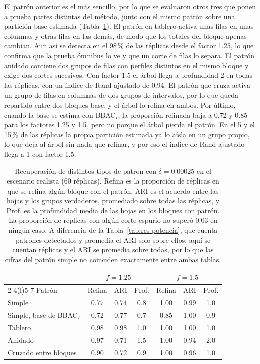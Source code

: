 El patrón anterior es el más sencillo, por lo que se evaluaron otros tres que ponen
a prueba partes distintas del método, junto con el mismo patrón sobre una partición
base estimada (Tabla~\ref{tab:res-patrones}). El patrón en tablero activa unas
filas en unas columnas y otras filas en las demás, de modo que los totales del
bloque apenas cambian. Aun así se detecta en el 98\,\% de las réplicas desde el
factor 1.25, lo que confirma que la prueba ómnibus lo ve y que un corte de filas lo
separa. El patrón anidado contiene dos grupos de filas con perfiles distintos en el
mismo bloque y exige dos cortes sucesivos. Con factor 1.5 el árbol llega a
profundidad 2 en todas las réplicas, con un índice de Rand ajustado de 0.94. El
patrón que cruza activa un grupo de filas en columnas de dos grupos de intervalos,
por lo que queda repartido entre dos bloques base, y el árbol lo refina en ambos.
Por último, cuando la base se estima con BBAC$_I$, la proporción refinada baja a
0.72 y 0.85 para los factores 1.25 y 1.5, pero no porque el árbol pierda el patrón.
En el 5 y el 15\,\% de las réplicas la propia partición estimada ya lo aísla en
un grupo propio, lo que deja al árbol sin nada que refinar, y por eso el índice de
Rand ajustado llega a 1 con factor 1.5.

\begin{table}[t]
\centering
\small
\begin{tabular}{@{}lcccccc@{}}
\toprule
 & \multicolumn{3}{c}{$f = 1.25$} & \multicolumn{3}{c}{$f = 1.5$} \\
\cmidrule(lr){2-4}\cmidrule(l){5-7}
Patrón & Refina & ARI & Prof. & Refina & ARI & Prof. \\
\midrule
Simple                       & 0.77 & 0.74 & 0.8 & 1.00 & 0.99 & 1.0 \\
Simple, base de BBAC$_I$     & 0.72 & 0.77 & 0.7 & 0.85 & 1.00 & 0.9 \\
Tablero                      & 0.98 & 0.98 & 1.0 & 1.00 & 1.00 & 1.0 \\
Anidado                      & 0.97 & 0.71 & 1.5 & 1.00 & 0.94 & 2.0 \\
Cruzado entre bloques        & 0.90 & 0.72 & 0.9 & 1.00 & 0.96 & 1.0 \\
\bottomrule
\end{tabular}
\caption{Recuperación de distintos tipos de patrón con $\delta = 0.00025$ en el
escenario realista (60 réplicas). Refina es la proporción de réplicas en que se
refina algún bloque con el patrón, ARI es el acuerdo entre las hojas y los grupos
verdaderos, promediado sobre todas las réplicas, y Prof. es la profundidad media
de las hojas en los bloques con patrón. La proporción de réplicas con algún corte
espurio no superó 0.03 en ningún caso. A diferencia de la
Tabla~\ref{tab:res-potencia}, que cuenta patrones detectados y promedia el ARI
solo sobre ellos, aquí se cuentan réplicas y el ARI se promedia sobre todas, por
lo que las cifras del patrón simple no coinciden exactamente entre ambas tablas.}
\label{tab:res-patrones}
\end{table}

